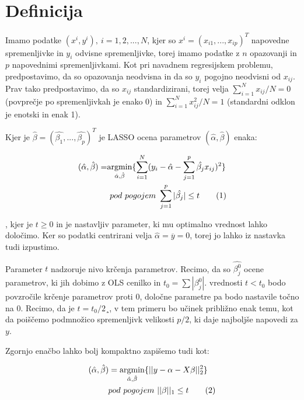 \documentclass[onecolumn]{report}
\newcommand\numberthis{\addtocounter{equation}{1}\tag{\theequation}}
\begin{document}
\section*{Definicija}

Imamo podatke $(x^i, y^i), \	 i = 1, 2, ..., N$, kjer so $x^i = (x_{i1}, ..., x_{ip})^T$ napovedne spremenljivke in $y_i$ odvisne spremenljivke, torej imamo podatke z $n$ opazovanji in $p$ napovednimi spremenljivkami. Kot pri navadnem regresijskem problemu, predpostavimo, da so opazovanja neodvisna in da so $y_i$ pogojno neodvisni od $x_{ij}$. Prav tako predpostavimo, da so $x_{ij}$ standardizirani, torej velja $\sum_{i = 1}^{N} x_{ij}/N = 0$ (povprečje po spremenljivkah je enako 0) in $\sum_{i = 1}^{N} x_{ij}^2/N = 1$ (standardni odklon je enotski in enak 1). 

Kjer je $\hat{\beta} = (\hat{\beta_1}, ..., \hat{\beta_p})^T$ je LASSO ocena parametrov $(\hat{\alpha}, \hat{\beta})$ enaka:

\begin{align*}
	(\hat{\alpha}, \hat{\beta}) = & \underset{\hat{\alpha}, \hat{\beta}}{\operatorname{argmin}} \{ \sum_{i = 1}^{N}(y_i - \hat{\alpha} - \sum_{j = 1}^{p} \hat{\beta_j} x_{ij})^2 \} \\
	&\ pod \ pogojem \ \sum_{j = 1}^{p} |\hat{\beta_j}| \leq t
	\numberthis \label{eqn1} 
\end{align*}

, kjer je $t \geq 0$ in je nastavljiv parameter, ki mu optimalno vrednost lahko določimo. Ker so podatki centrirani velja $\hat{\alpha} = \overline{y} = 0$, torej jo lahko iz nastavka tudi izpustimo.

Parameter $t$ nadzoruje nivo krčenja parametrov. Recimo, da so $\hat{\beta^0_j}$ ocene parametrov, ki jih dobimo z OLS cenilko in $t_0 = \sum|\beta_j^0|$. vrednosti $t < t_0$ bodo povzročile krčenje parametrov proti 0, določne parametre pa bodo nastavile točno na 0. Recimo, da je $t = t_0/2¸$, v tem primeru bo učinek približno enak temu, kot da poiščemo podmnožico spremenljivk velikosti $p/2$, ki daje najboljše napovedi za $y$. 

Zgornjo enačbo lahko bolj kompaktno zapišemo tudi kot:

\begin{align*}
	(\hat{\alpha}, \hat{\beta}&) =  \underset{\hat{\alpha}, \hat{\beta}}{\operatorname{argmin}} \{ ||y - \alpha - X\beta||_2^2 \} \\
	&\ pod \ pogojem \ ||\beta||_1 \leq t
	\numberthis \label{eqn2} 
\end{align*}
\end{document}
